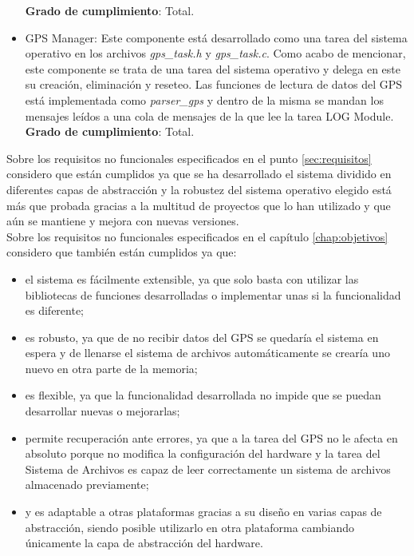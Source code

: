 \begin{itemize}
\textbf{Grado de cumplimiento}: Total.
\item GPS Manager: Este componente está desarrollado como una tarea del sistema operativo en los archivos \textit{gps\_task.h} y \textit{gps\_task.c}. Como acabo de mencionar, este componente se trata de una tarea del sistema operativo y delega en este su creación, eliminación y reseteo. Las funciones de lectura de datos del GPS está implementada como \textit{parser\_gps} y dentro de la misma se mandan los mensajes leídos a una cola de mensajes de la que lee la tarea LOG Module.
\newline
\textbf{Grado de cumplimiento}: Total.\\
\end{itemize}

Sobre los requisitos no funcionales especificados en el punto \ref{sec:requisitos} considero que están cumplidos ya que se ha desarrollado el sistema dividido en diferentes capas de abstracción y la robustez del sistema operativo elegido está más que probada gracias a la multitud de proyectos que lo han utilizado y que aún se mantiene y mejora con nuevas versiones.\\

Sobre los requisitos no funcionales especificados en el capítulo \ref{chap:objetivos} considero que también están cumplidos ya que:
\begin{itemize}
\item el sistema es fácilmente extensible, ya que solo basta con utilizar las bibliotecas de funciones desarrolladas o implementar unas si la funcionalidad es diferente;
\item es robusto, ya que de no recibir datos del GPS se quedaría el sistema en espera y de llenarse el sistema de archivos automáticamente se crearía uno nuevo en otra parte de la memoria;
\item es flexible, ya que la funcionalidad desarrollada no impide que se puedan desarrollar nuevas o mejorarlas;
\item permite recuperación ante errores, ya que a la tarea del GPS no le afecta en absoluto porque no modifica la configuración del hardware y la tarea del Sistema de Archivos es capaz de leer correctamente un sistema de archivos almacenado previamente;
\item y es adaptable a otras plataformas gracias a su diseño en varias capas de abstracción, siendo posible utilizarlo en otra plataforma cambiando únicamente la capa de abstracción del hardware. 
\end{itemize}    